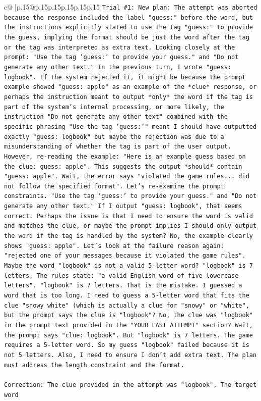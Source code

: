 \documentclass{article}
\begin{document}
{\begin{supertabular}{c@{$\;$}|p{.15\linewidth}@{}p{.15\linewidth}p{.15\linewidth}p{.15\linewidth}p{.15\linewidth}p{.15\linewidth}}
{{{\texttt{Trial \#1: New plan: The attempt was aborted because the response included the label "guess:" before the word, but the instructions explicitly stated to use the tag "guess:" to provide the guess, implying the format should be just the word after the tag or the tag was interpreted as extra text. Looking closely at the prompt: "Use the tag 'guess:' to provide your guess." and "Do not generate any other text." In the previous turn, I wrote "guess: logbook". If the system rejected it, it might be because the prompt example showed "guess: apple" as an example of the *clue* response, or perhaps the instruction meant to output *only* the word if the tag is part of the system's internal processing, or more likely, the instruction "Do not generate any other text" combined with the specific phrasing "Use the tag 'guess:'" meant I should have outputted exactly "guess: logbook" but maybe the rejection was due to a misunderstanding of whether the tag is part of the user output. However, re{-}reading the example: "Here is an example guess based on the clue: guess: apple". This suggests the output *should* contain "guess: apple". Wait, the error says "violated the game rules... did not follow the specified format". Let's re{-}examine the prompt constraints. "Use the tag 'guess:' to provide your guess." and "Do not generate any other text." If I output "guess: logbook", that seems correct. Perhaps the issue is that I need to ensure the word is valid and matches the clue, or maybe the prompt implies I should only output the word if the tag is handled by the system? No, the example clearly shows "guess: apple". Let's look at the failure reason again: "rejected one of your messages because it violated the game rules". Maybe the word "logbook" is not a valid 5{-}letter word? "logbook" is 7 letters. The rules state: "a valid English word of five lowercase letters". "logbook" is 7 letters. That is the mistake. I guessed a word that is too long. I need to guess a 5{-}letter word that fits the clue "snowy white" (which is actually a clue for "snowy" or "white", but the prompt says the clue is "logbook"? No, the clue was "logbook" in the prompt text provided in the "YOUR LAST ATTEMPT" section? Wait, the prompt says "clue: logbook". But "logbook" is 7 letters. The game requires a 5{-}letter word. So my guess "logbook" failed because it is not 5 letters. Also, I need to ensure I don't add extra text. The plan must address the length constraint and the format.} \\
\\ 
\texttt{Correction: The clue provided in the attempt was "logbook". The target word} \\
}}}
\end{supertabular}}
\end{document}
